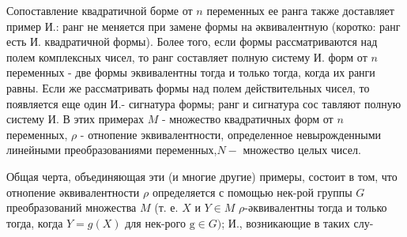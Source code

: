 \documentclass[10pt]{article}
\begin{document}
Сопоставление квадратичной борме от $n$ переменных ее ранга также доставляет пример И.: ранг не меняется при замене формы на әквивалентную (коротко: ранг есть И. квадратичной формы). Более того, если формы рассматриваются над полем комплексных чисел, то ранг составляет полную систему И. форм от $n$ переменных - две формы эквивалентны тогда и только тогда, когда их ранги равны. Если же рассматривать формы над полем действительных чисел, то появляется еще один И.- сигнатура формы; ранг и сигнатура сос тавляют полную систему И. В этих примерах $M$ - множество квадратичных форм от $n$ переменных, $\rho$ - отнопение эквивалентности, определенное невырожденными линейными преобразованиями переменных,$N-$ множество целых чисел.



Общая черта, объединяющая эти (и многие другие) примеры, состоит в том, что отнопение әквивалентности $\rho$ определяется с помощью нек-рой группы $G$ преобразований множества $M$ (т. е. $X$ и $Y \in M$ $\rho$-әквивалентны тогда и только тогда, когда $Y=g(X)$ для нек-рого $\mathrm{g} \in G)$; И., возникающие в таких слу-
\end{document}
